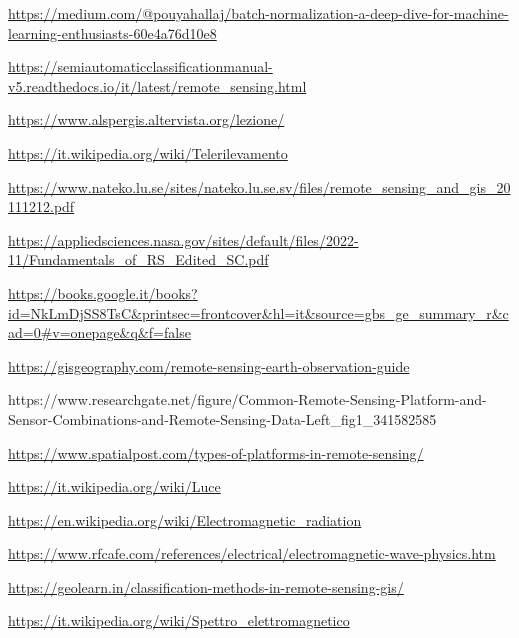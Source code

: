 \begin{thebibliography}{99}
\url{https://medium.com/@pouyahallaj/batch-normalization-a-deep-dive-for-machine-learning-enthusiasts-60e4a76d10e8}


\url{https://semiautomaticclassificationmanual-v5.readthedocs.io/it/latest/remote_sensing.html}

\url{https://www.alspergis.altervista.org/lezione/}

\url{https://it.wikipedia.org/wiki/Telerilevamento}

\url{https://www.nateko.lu.se/sites/nateko.lu.se.sv/files/remote_sensing_and_gis_20111212.pdf}

\url{https://appliedsciences.nasa.gov/sites/default/files/2022-11/Fundamentals_of_RS_Edited_SC.pdf}

\url{https://books.google.it/books?id=NkLmDjSS8TsC&printsec=frontcover&hl=it&source=gbs_ge_summary_r&cad=0#v=onepage&q&f=false}

\url{https://gisgeography.com/remote-sensing-earth-observation-guide}

https://www.researchgate.net/figure/Common-Remote-Sensing-Platform-and-
Sensor-Combinations-and-Remote-Sensing-Data-Left\_fig1\_341582585

\url{https://www.spatialpost.com/types-of-platforms-in-remote-sensing/}

\url{https://it.wikipedia.org/wiki/Luce}

\url{https://en.wikipedia.org/wiki/Electromagnetic_radiation}

\url{https://www.rfcafe.com/references/electrical/electromagnetic-wave-physics.htm}

\url{https://geolearn.in/classification-methods-in-remote-sensing-gis/}

\url{https://it.wikipedia.org/wiki/Spettro_elettromagnetico}


\end{thebibliography}
